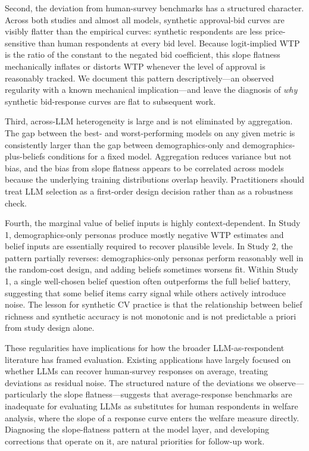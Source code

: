 \documentclass[12pt]{article}
\begin{document}
Second, the deviation from human-survey benchmarks has a structured
character. Across both studies and almost all models, synthetic
approval-bid curves are visibly flatter than the empirical curves: synthetic
respondents are less price-sensitive than human respondents at every bid
level. Because logit-implied WTP is the ratio of the constant to the
negated bid coefficient, this slope flatness mechanically inflates or
distorts WTP whenever the level of approval is reasonably tracked. We
document this pattern descriptively---an observed regularity with a known
mechanical implication---and leave the diagnosis of \emph{why} synthetic
bid-response curves are flat to subsequent work.

Third, across-LLM heterogeneity is large and is not eliminated by
aggregation. The gap between the best- and worst-performing models on any
given metric is consistently larger than the gap between demographics-only
and demographics-plus-beliefs conditions for a fixed model. Aggregation
reduces variance but not bias, and the bias from slope flatness appears
to be correlated across models because the underlying training distributions
overlap heavily. Practitioners should treat LLM selection as a first-order
design decision rather than as a robustness check.

Fourth, the marginal value of belief inputs is highly context-dependent.
In Study 1, demographics-only personas produce mostly negative WTP
estimates and belief inputs are essentially required to recover plausible
levels. In Study 2, the pattern partially reverses: demographics-only
personas perform reasonably well in the random-cost design, and adding
beliefs sometimes worsens fit. Within Study 1, a single well-chosen belief
question often outperforms the full belief battery, suggesting that some
belief items carry signal while others actively introduce noise. The
lesson for synthetic CV practice is that the relationship between belief
richness and synthetic accuracy is not monotonic and is not predictable
a priori from study design alone.

These regularities have implications for how the broader
LLM-as-respondent literature has framed evaluation. Existing applications
\parencite{Brand2024, Horton2023, Aher2023} have largely focused on whether
LLMs can recover human-survey responses on average, treating deviations as
residual noise. The structured nature of the deviations we observe---
particularly the slope flatness---suggests that average-response benchmarks
are inadequate for evaluating LLMs as substitutes for human respondents in
welfare analysis, where the slope of a response curve enters the welfare
measure directly. Diagnosing the slope-flatness pattern at the model layer,
and developing corrections that operate on it, are natural priorities for
follow-up work.
\end{document}
